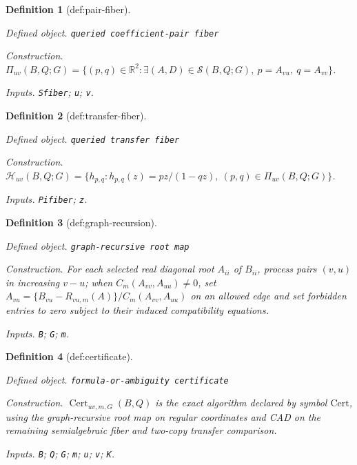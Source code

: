 \documentclass{article}
\newtheorem{definition}{Definition}
\begin{document}
\begin{definition}[def:pair-fiber]\label{def:pair-fiber}
\par\smallskip\noindent\emph{Defined object.} \texttt{queried coefficient-\allowbreak{}pair fiber}
\par\smallskip\noindent\emph{Construction.} \(\Pi_{uv}(B,Q;G)=\{(p,q)\in\mathbb R^2:\exists(A,D)\in\mathcal S(B,Q;G),\ p=A_{vu},\ q=A_{vv}\}\).
\par\smallskip\noindent\emph{Inputs.} \texttt{Sfiber}; \texttt{u}; \texttt{v}.
\end{definition}

\begin{definition}[def:transfer-fiber]\label{def:transfer-fiber}
\par\smallskip\noindent\emph{Defined object.} \texttt{queried transfer fiber}
\par\smallskip\noindent\emph{Construction.} \(\mathcal H_{uv}(B,Q;G)=\{h_{p,q}:h_{p,q}(z)=pz/(1-qz),\ (p,q)\in\Pi_{uv}(B,Q;G)\}\).
\par\smallskip\noindent\emph{Inputs.} \texttt{Pifiber}; \texttt{z}.
\end{definition}

\begin{definition}[def:graph-recursion]\label{def:graph-recursion}
\par\smallskip\noindent\emph{Defined object.} \texttt{graph-\allowbreak{}recursive root map}
\par\smallskip\noindent\emph{Construction.} For each selected real diagonal root \(A_{ii}\) of \(B_{ii}\), process pairs \((v,u)\) in increasing \(v-u\); when \(C_m(A_{vv},A_{uu})\ne0\), set \(A_{vu}=\{B_{vu}-R_{vu,m}(A)\}/C_m(A_{vv},A_{uu})\) on an allowed edge and set forbidden entries to zero subject to their induced compatibility equations.
\par\smallskip\noindent\emph{Inputs.} \texttt{B}; \texttt{G}; \texttt{m}.
\end{definition}

\begin{definition}[def:certificate]\label{def:certificate}
\par\smallskip\noindent\emph{Defined object.} \texttt{formula-\allowbreak{}or-\allowbreak{}ambiguity certificate}
\par\smallskip\noindent\emph{Construction.} \(\operatorname{Cert}_{uv,m,G}(B,Q)\) is the exact algorithm declared by symbol \(\mathrm{Cert}\), using the graph-recursive root map on regular coordinates and CAD on the remaining semialgebraic fiber and two-copy transfer comparison.
\par\smallskip\noindent\emph{Inputs.} \texttt{B}; \texttt{Q}; \texttt{G}; \texttt{m}; \texttt{u}; \texttt{v}; \texttt{K}.
\end{definition}
\end{document}
